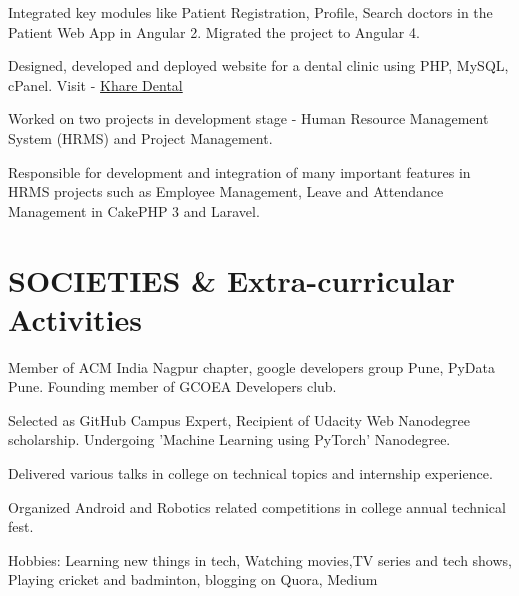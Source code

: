 \documentclass[]{deedy-resume-openfont}
\begin{document}
\begin{minipage}[t]{0.66\textwidth}
    
    \sectionsep
    
    
    \begin{tightemize}
     \item Integrated key modules like Patient Registration, Profile, Search doctors in the Patient Web App in Angular 2. Migrated the project to Angular 4. \item Designed, developed and deployed website for a dental clinic using PHP, MySQL, cPanel. Visit - \href{http://www.kharedentalclinic.com}{Khare Dental}  \end{tightemize}
     
    \sectionsep
    
    \vspace{1mm}
    \begin{tightemize}
     \item Worked on two projects in development stage - Human Resource Management System (HRMS) and Project Management. \item Responsible for development and integration of many important features in HRMS projects such as Employee Management, Leave and Attendance Management in CakePHP 3 and Laravel.  
    \end{tightemize}
    
    \sectionsep
    
    
    \section{SOCIETIES \& Extra-curricular Activities} 
    \vspace{3mm}
    \begin{tightemize}
        \item Member of ACM India Nagpur chapter, google developers group Pune, PyData Pune. Founding member of GCOEA Developers club.
        \item Selected as GitHub Campus Expert, Recipient of Udacity Web Nanodegree scholarship. Undergoing 'Machine Learning using PyTorch' Nanodegree.
        \item Delivered various talks in college on technical topics and internship experience.
        \item Organized Android and Robotics related competitions in college annual technical fest.
        \item Hobbies: Learning new things in tech, Watching movies,TV series and tech shows, Playing cricket and badminton, blogging on Quora, Medium
    \end{tightemize}
    
    \sectionsep
    
    \end{minipage} 
    
\end{document}
